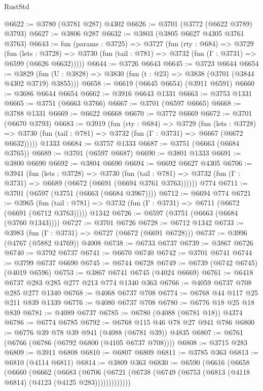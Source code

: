 \begin{lexlean}{RustStd}
\begin{coremodule}
@6622 := @3780 (@3781 @287) @4302
@6626 := @3701 (@3772 (@6622 @3789) @3793)
@6627 := @3806 @287
@6632 := @3803 (@3805 @6627 @4305 @3761 @3763)
@6643 := fun (params : @3725) =>
  @3727
    (fun (rty : @684) =>
    @3729
      (fun (lets : @3728) =>
      @3730 (fun (tail : @781) => @3732 (fun (Γ : @3731) => @6599 (@6626 @6632)))))
@6644 := @3726 @6643
@6645 := @3723 @6644
@6654 := @3829 (fun (U : @3828) => @3830 (fun (t : @23) => @3838 (@3701 (@3844 @4302 @3719) @3855)))
@6658 := @6619 (@6645 @6654) (@3911 @6591)
@6660 := @3686 @6644 @6654
@6662 := @3916 @6643 @1331
@6663 := @3753 @1331
@6665 := @3751 (@6663 @3766)
@6667 := @3701 (@6597 @6665)
@6668 := @3788 @1331
@6669 := @6622 @6668
@6670 := @3772 @6669
@6672 := @3701 (@6670 @3793)
@6683 := @3919
    (fun (rty : @684) =>
    @3729
      (fun (lets : @3728) =>
      @3730 (fun (tail : @781) => @3732 (fun (Γ : @3731) => @6667 (@6672 @6632)))))
    @1333
@6684 := @3757 @1333
@6687 := @3751 (@6663 (@6684 @3765))
@6689 := @3701 (@6597 @6687)
@6690 := @3801 @1333
@6691 := @3800 @6690
@6692 := @3804 @6690
@6694 := @6692 @6627 @4305
@6706 := @3941
    (fun (lets : @3728) =>
    @3730
      (fun (tail : @781) => @3732 (fun (Γ : @3731) => @6689 (@6672 (@6691 (@6694 @3761 @3763))))))
    @774
@6711 := @3701 (@6597 (@3751 (@6663 (@6684 @3967))))
@6712 := @6694 @774
@6721 := @3965
    (fun (tail : @781) => @3732 (fun (Γ : @3731) => @6711 (@6672 (@6691 (@6712 @3763)))))
    @1342
@6726 := @6597 (@3751 (@6663 (@6684 (@3760 @1343))))
@6727 := @3701 @6726
@6728 := @6712 @1342
@6733 := @3983 (fun (Γ : @3731) => @6727 (@6672 (@6691 @6728)))
@6737 := @3996 (@4767 (@5882 @4769)) @4008
@6738 := @6733 @6737
@6739 := @3867 @6726
@6740 := @3792 @6737
@6741 := @6670 @6740
@6742 := @3701 @6741
@6744 := @3799 @6737 @6690
@6745 := @6744 @6728
@6749 := @6739 (@6742 @6745) (@4019 @6596)
@6753 := @3867 @6741 @6745 (@4024 @6669)
@6761 := @6418 @6737 @283 @285 @277 @213 @774 @1340 @363
@6766 := @4059 @6737 @708 @285 @277 @1340
@6768 := @4068 @6737 @708
@6774 := @6768 @44 @117 @25 @211 @839 @1339
@6776 := @4080 @6737 @708
@6780 := @6776 @18 @25 @18 @839
@6781 := @4089 @6737
@6785 := @6780 (@4088 (@6781 @18)) @4374
@6786 := @6774 @6785
@6792 := @6768 @115 @46 @78 @27 @941 @786
@6800 := @6776 @39 @78 @39 @941 (@4088 (@6781 @39)) @4835
@6807 := @6761 (@6766 (@6786 (@6792 @6800 (@4105 @6737 @708))))
@6808 := @3715 @283
@6809 := @3911 @6808
@6810 := @6807 @6809
@6811 := @3785 @363
@6813 := @6810 (@4114 @6811)
@6814 := @3809 @363
@6830 := @6590
    (@6616
      (@6658
        (@6660
          (@6662
            (@6683
              (@6706
                (@6721 (@6738 (@6749 (@6753 (@6813 (@4118 @6814) (@4123 (@4125 @283)))))))))))))

\end{coremodule}
\end{lexlean}

